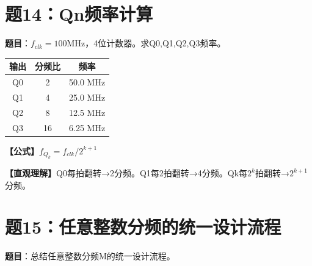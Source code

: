 \section{题14：Qn频率计算}

\textbf{题目}：$f_{clk}=100$MHz，4位计数器。求Q0,Q1,Q2,Q3频率。

\begin{solution}[完整解答]

\begin{center}
\begin{tabular}{|c|c|c|}
\hline 输出 & 分频比 & 频率 \\ \hline
Q0 & 2 & 50.0 MHz \\ \hline
Q1 & 4 & 25.0 MHz \\ \hline
Q2 & 8 & 12.5 MHz \\ \hline
Q3 & 16 & 6.25 MHz \\ \hline
\end{tabular}
\end{center}

\textbf{【公式】}$f_{Q_k} = f_{clk} / 2^{k+1}$

\textbf{【直观理解】}Q0每拍翻转→2分频。Q1每2拍翻转→4分频。Qk每$2^k$拍翻转→$2^{k+1}$分频。

\end{solution}


\section{题15：任意整数分频的统一设计流程}

\textbf{题目}：总结任意整数分频M的统一设计流程。


